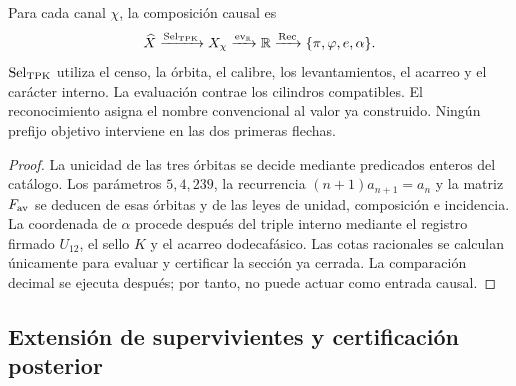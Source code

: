 \begin{proposition}
\label{prop:generacion-monodromica-separacion-causal-rev7}
Para cada canal \(\chi\), la composición causal es
\[
 \widehat X
 \xrightarrow{\operatorname{Sel}_{\rm TPK}}
 X_\chi
 \xrightarrow{\operatorname{ev}_{\mathbb R}}
 \mathbb R
 \xrightarrow{\operatorname{Rec}}
 \{\pi,\varphi,e,\alpha\}.
\]
\(\operatorname{Sel}_{\rm TPK}\) utiliza el censo, la órbita, el calibre,
los levantamientos, el acarreo y el carácter interno. La evaluación contrae
los cilindros compatibles. El reconocimiento asigna el nombre convencional
al valor ya construido. Ningún prefijo objetivo interviene en las dos primeras
flechas.
\end{proposition}

\begin{proof}
La unicidad de las tres órbitas se decide mediante predicados enteros del
catálogo. Los parámetros \(5,4,239\), la recurrencia
\((n+1)a_{n+1}=a_n\) y la matriz \(F_{\rm av}\) se deducen de esas órbitas y
de las leyes de unidad, composición e incidencia. La coordenada de
\(\alpha\) procede después del triple interno mediante el registro firmado
\(U_{12}\), el sello \(K\) y el acarreo dodecafásico. Las cotas racionales se
calculan únicamente para evaluar y certificar la sección ya cerrada. La
comparación decimal se ejecuta después; por tanto, no puede actuar como
entrada causal.
\end{proof}

\subsection{Extensión de supervivientes y certificación posterior}

